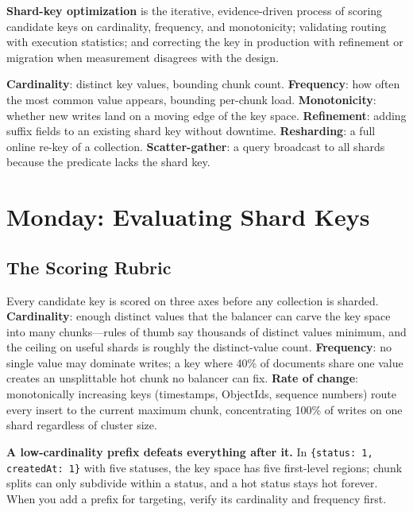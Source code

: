 \begin{definitionbox}
\textbf{Shard-key optimization} is the iterative, evidence-driven process of scoring candidate keys on cardinality, frequency, and monotonicity; validating routing with execution statistics; and correcting the key in production with refinement or migration when measurement disagrees with the design.
\end{definitionbox}

\begin{keyterms}
\textbf{Cardinality}: distinct key values, bounding chunk count. \textbf{Frequency}: how often the most common value appears, bounding per-chunk load. \textbf{Monotonicity}: whether new writes land on a moving edge of the key space. \textbf{Refinement}: adding suffix fields to an existing shard key without downtime. \textbf{Resharding}: a full online re-key of a collection. \textbf{Scatter-gather}: a query broadcast to all shards because the predicate lacks the shard key.
\end{keyterms}

\section{Monday: Evaluating Shard Keys}
\subsection{The Scoring Rubric}
Every candidate key is scored on three axes before any collection is sharded. \textbf{Cardinality}: enough distinct values that the balancer can carve the key space into many chunks---rules of thumb say thousands of distinct values minimum, and the ceiling on useful shards is roughly the distinct-value count. \textbf{Frequency}: no single value may dominate writes; a key where 40\% of documents share one value creates an unsplittable hot chunk no balancer can fix. \textbf{Rate of change}: monotonically increasing keys (timestamps, ObjectIds, sequence numbers) route every insert to the current maximum chunk, concentrating 100\% of writes on one shard regardless of cluster size.

\begin{pitfall}
\textbf{A low-cardinality prefix defeats everything after it.} In \texttt{\{status: 1, createdAt: 1\}} with five statuses, the key space has five first-level regions; chunk splits can only subdivide within a status, and a hot status stays hot forever. When you add a prefix for targeting, verify its cardinality and frequency first.
\end{pitfall}

